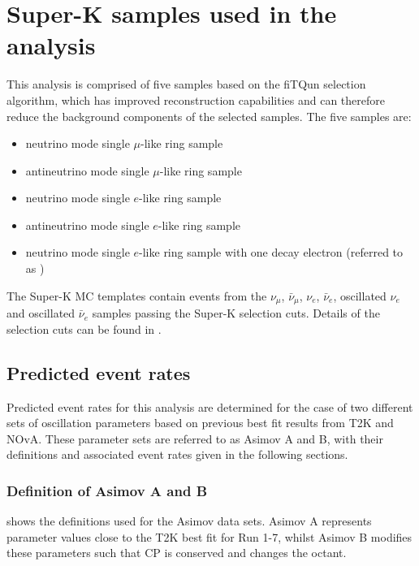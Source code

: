 
\section {Super-K samples used in the analysis}
\label{sec:samples}

This analysis is comprised of five samples based on the fiTQun selection algorithm, which has improved reconstruction capabilities and can therefore reduce the background components of the selected samples. The five samples are:
\begin{itemize}
	\item neutrino mode single $\mu$-like ring sample
	\item antineutrino mode single $\mu$-like ring sample
	\item neutrino mode single $e$-like ring sample
	\item antineutrino mode single $e$-like ring sample
	\item neutrino mode single $e$-like ring sample with one decay electron (referred to as \nueCConepi{})
\end{itemize}
The Super-K MC templates contain events from the $\nu_{\mu}$, $\bar{\nu}_{\mu}$, $\nu_{e}$, $\bar{\nu}_{e}$, oscillated $\nu_{e}$ and oscillated $\bar{\nu}_{e}$ samples passing the Super-K selection cuts. Details of the selection cuts can be found in \cite{Superk_run8}.

\subsection {Predicted event rates}
\label{sec:spectrum_prediction}
Predicted event rates for this analysis are determined for the case of two different sets of oscillation parameters based on previous best fit results from T2K and NOvA. These parameter sets are referred to as Asimov A and B, with their definitions and associated event rates given in the following sections.

\subsubsection{Definition of Asimov A and B}
\label{sec:asimov_definition}
 shows the definitions used for the Asimov data sets. Asimov A represents parameter values close to the T2K best fit for Run 1-7, whilst Asimov B modifies these parameters such that CP is conserved and changes the \ssqthtwothree octant.


